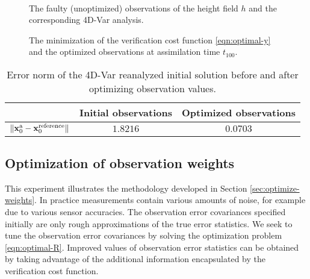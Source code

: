 \documentclass{article}
\newcommand{\x}{   \mathbf{x} }
\newcommand{\xa}{ \mathbf{x}^{\rm a} }
\begin{document}
\begin{figure}
\setcounter{subfigure}{0} 
\centering
  \\
\caption{The faulty (unoptimized) observations of the height field $h$ and the corresponding 4D-Var analysis.}
\end{figure}

\begin{figure}
\setcounter{subfigure}{0}
\centering
 \caption{The minimization of the verification cost function \eqref{eqn:optimal-y} and the optimized observations at assimilation time $t_{100}$.}
\label{fig:optobs_OBSVAL}
\end{figure}



\begin{table}
\caption{Error norm of the 4D-Var reanalyzed initial solution before and after optimizing observation values.}
\centering
{
\begin{tabular}{|c||c|c|}
  \hline
 &  Initial observations & Optimized observations \\
 \hline\hline
$\Vert \xa_0 - \x_0^{\rm reference} \Vert$ &  $1.8216$ & $0.0703$\\
 \hline
\end{tabular}
}
\label{Table:obsopt_gain1}
\end{table}

\subsection{Optimization of observation weights}


This experiment illustrates the methodology developed in Section \ref{sec:optimize-weights}.
In practice measurements contain various amounts of noise,
for example due to various sensor accuracies.
The observation error covariances specified initially are only rough approximations of
the true error statistics. We seek to tune the observation error covariances by solving the optimization 
problem \eqref{eqn:optimal-R}. Improved values of observation error statistics can be obtained 
by taking advantage of the additional information encapsulated by the verification cost function.
 
\end{document}
